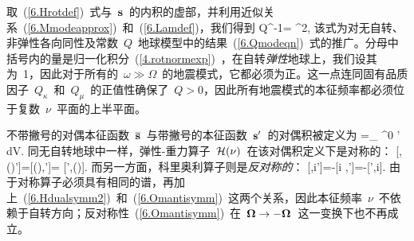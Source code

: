 取~(\ref{6.Hrotdef})~式与~$\mbox{${\bf s}$}$~的内积的虚部，并利用近似关系~(\ref{6.Mmodeapprox})~和~(\ref{6.Lamdef})，我们得到
%
%
\eq
\label{6.Qmoderot}
Q^{-1}=
{\omega^2},
\en
该式为对无自转、非弹性各向同性及常数~$Q$~地球模型中的结果~(\ref{6.Qmodeqn})~式的推广。分母中括号内的量是归一化积分~(\ref{4.rotnormexp})~，在自转{\em 弹性\/}地球上，我们设其为~1，因此对于所有的~$\omega \gg\Omega$~的地震模式，它都必须为正。这一点连同固有品质因子~$Q_{\kappa}$~和~$Q_{\mu}$~的正值性确保了~$Q>0$，因此所有地震模式的本征频率都必须位于复数~$\nu$~平面的上半平面。

不带撇号的对偶本征函数~$\overline{\mbox{${\bf s}$}}$~与带撇号的本征函数~$\mbox{${\bf s}$}'$~的对偶积被定义为
%
=\int_{\subearth}
\rho^0\hspace{0.2 mm}\overline{\bs}
\cdot\bs'\,dV.
\en
同无自转地球中一样，弹性-重力算子~$\mbox{$\cal H$}(\nu)$~在该对偶积定义下是对称的：
\eq
\label{6.Hdualsymm2}
[\hspace{0.3 mm}\overline{\bs},\sH(\nu)\bs']=[\sH(\nu)\overline{\bs},\bs']=
[\bs',\sH(\nu)\overline{\bs}\hspace{0.3 mm}].
\en
而另一方面，科里奥利算子则是{\em 反对称的\/}：
%
%
\eq
\label{6.Omantisymm}
[\hspace{0.3 mm}\overline{\bs},i\bOmega\times\bs']=-[i\bOmega\times
\overline{\bs},\bs']=-[\bs',i\bOmega\times\overline{\bs}\hspace{0.3 mm}].
\en
由于对称算子必须具有相同的谱，再加上~(\ref{6.Hdualsymm2})~和~(\ref{6.Omantisymm})~这两个关系，因此本征频率~$\nu$~不依赖于自转方向；反对称性~(\ref{6.Omantisymm})~在~$\mbox{\boldmath $\bf \Omega$}\rightarrow -\mbox{\boldmath $\bf \Omega$}$~这一变换下也不再成立。

